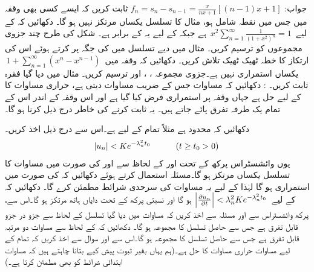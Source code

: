جواب:\quad
$f_n=s_n-s_{n-1}=\frac{x}{nx+1}[(n-1)x+1]$
\quad
ثابت کریں کہ ایسے کسی بھی  وقفہ میں جس میں نقطہ  شامل ہو، مثال  کا تسلسل یکساں مرتکز نہیں ہو گا۔ 
\quad
دکھائیں کہ   کے لیے 
$\,x^2\sum\limits_{n=1}^{\infty} \tfrac{1}{(1+x^2)^n}=1\,$
ہے جبکہ  کے لیے یہ  کے برابر ہے۔ شکل  کی طرح چند جزوی مجموعوں کو ترسیم کریں۔
\quad
مثال  میں دیے تسلسل میں  کی جگہ  پر کرتے ہوئے اس کی  ارتکاز کا خطہ ٹھیک ٹھیک تلاش کریں۔
\quad
دکھائیں کہ وقفہ  میں 
$\,1+\sum\limits_{n=1}^{\infty} (x^n-x^{n-1})\,$
یکساں استمراری نہیں ہے۔جزوی مجموعہ ، ،  اور  ترسیم کریں۔
\quad
مثال  میں دیا گیا فقرہ ثابت کریں۔
: دکھائیں کہ مساوات  جس کے  ضریب  مساوات  دیتی ہے، حراری مساوات کا   کے لیے حل ہے جہاں وقفہ  پر  استمراری فرض کیا گیا ہے اور اس وقفہ کے اندر اس کے تمام یک طرفہ تفرق پائے جاتے ہیں۔ یہ ثابت کرنے کی خاطر درج ذیل کرنا ہو گا۔

\quad
دکھائیں کہ  محدود ہے مثلاً تمام  کے لیے  ہے۔اس سے  درج ذیل اخذ کریں۔ 
\begin{align*}
\abs{u_n}<K e^{-\lambda_n^2 t_0}\quad \quad \quad (t\ge t_0 >0)
\end{align*}
یوں وائشسٹراس پرکھ  کے تحت   اور  کے لحاظ سے  اور  کی صورت میں مساوات  کا تسلسل یکساں مرتکز ہو گا۔مسئلہ  استعمال کرتے ہوئے دکھائیں کہ  کی صورت میں  استمراری ہو گا  لہٰذا  کے لیے یہ مساوات  کی سرحدی شرائط مطمئن کرے گا۔
\quad
دکھائیں کہ  کے لیے
$\,\abs{\frac{\partial u_n}{\partial t}}<\lambda^2_n Ke^{-\lambda^2_n t_0}\,$
ہو گا اور نسبتی پرکھ کے تحت دایاں ہاتھ مرتکز ہو گا۔اس سے، پرکھ وائشسٹراس سے اور مسئلہ  سے  اخذ کریں کہ مساوات  میں دیا گیا تسلسل  کے لحاظ سے جزو در جزو قابل تفرق ہے جس سے  حاصل تسلسل کا مجموعہ  ہو گا۔ دکھائیں کہ  کے لحاظ سے مساوات   دو مرتبہ قابل تفرق ہے جس سے  حاصل تسلسل کا مجموعہ
  ہو گا۔اس سے اور سوال  سے اخذ کریں کہ تمام  کے لیے مساوات  حراری مساوات کا حل ہے۔(ہم یہاں بغیر ثبوت پیش کیے بتانا چاہتے ہیں کہ مساوات  ابتدائی شرائط کو بھی مطمئن کرتا ہے۔)

